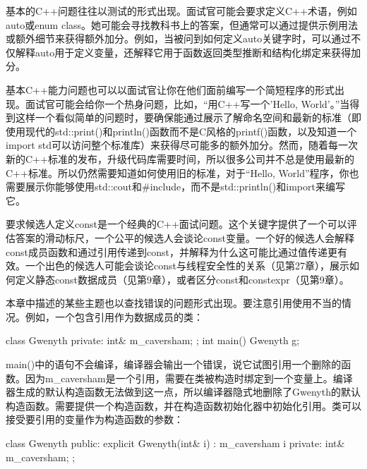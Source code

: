 
基本的C++问题往往以测试的形式出现。面试官可能会要求定义C++术语，例如auto或enum class。她可能会寻找教科书上的答案，但通常可以通过提供示例用法或额外细节来获得额外加分。例如，当被问到如何定义auto关键字时，可以通过不仅解释auto用于定义变量，还解释它用于函数返回类型推断和结构化绑定来获得加分。

基本C++能力问题也可以以面试官让你在他们面前编写一个简短程序的形式出现。面试官可能会给你一个热身问题，比如，“用C++写一个'Hello, World'。”当得到这样一个看似简单的问题时，要确保能通过展示了解命名空间和最新的标准（即使用现代的std::print()和println()函数而不是C风格的printf()函数，以及知道一个import std可以访问整个标准库）来获得尽可能多的额外加分。然而，随着每一次新的C++标准的发布，升级代码库需要时间，所以很多公司并不总是使用最新的C++标准。所以仍然需要知道如何使用旧的标准，对于“Hello, World”程序，你也需要展示你能够使用std::cout和\#include，而不是std::println()和import来编写它。

要求候选人定义const是一个经典的C++面试问题。这个关键字提供了一个可以评估答案的滑动标尺，一个公平的候选人会谈论const变量。一个好的候选人会解释const成员函数和通过引用传递到const，并解释为什么这可能比通过值传递更有效。一个出色的候选人可能会谈论const与线程安全性的关系（见第27章），展示如何定义静态const数据成员（见第9章），或者区分const和constexpr（见第9章）。

本章中描述的某些主题也以查找错误的问题形式出现。要注意引用使用不当的情况。例如，一个包含引用作为数据成员的类：

\begin{cpp}
class Gwenyth
{
    private:
        int& m_caversham;
};
int main()
{
    Gwenyth g;
}
\end{cpp}

main()中的语句不会编译，编译器会输出一个错误，说它试图引用一个删除的函数。因为m\_caversham是一个引用，需要在类被构造时绑定到一个变量上。编译器生成的默认构造函数无法做到这一点，所以编译器隐式地删除了Gwenyth的默认构造函数。需要提供一个构造函数，并在构造函数初始化器中初始化引用。类可以接受要引用的变量作为构造函数的参数：

\begin{cpp}
class Gwenyth
{
    public:
        explicit Gwenyth(int& i) : m_caversham { i } { }
    private:
        int& m_caversham;
};
\end{cpp}
